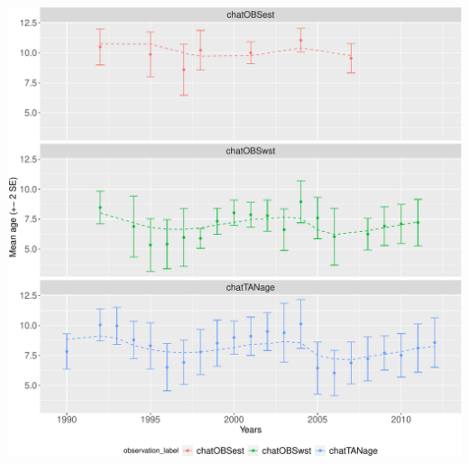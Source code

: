 \documentclass[
]{book}
\begin{document}
\includegraphics{_main_files/figure-latex/plot_mean_age_fit-1.pdf}
\end{document}
